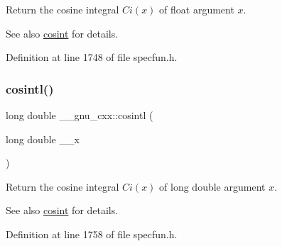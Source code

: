 Return the cosine integral $ Ci(x) $ of {\ttfamily float} argument $ x $.

\begin{DoxySeeAlso}{See also}
\hyperlink{group__gnu__math__spec__func_gafd398869cde057087e6b3428a1d13a93}{cosint} for details. 
\end{DoxySeeAlso}


Definition at line 1748 of file specfun.\+h.

\mbox{\label{group__gnu__math__spec__func_ga5f01f17ae8859129860118b09d51791c}} 
\subsubsection{\texorpdfstring{cosintl()}{cosintl()}}
{\footnotesize\ttfamily long double \+\_\+\+\_\+gnu\+\_\+cxx\+::cosintl (\begin{DoxyParamCaption}\item[{long double}]{\+\_\+\+\_\+x }\end{DoxyParamCaption})\hspace{0.3cm}{\ttfamily [inline]}}

Return the cosine integral $ Ci(x) $ of {\ttfamily long double} argument $ x $.

\begin{DoxySeeAlso}{See also}
\hyperlink{group__gnu__math__spec__func_gafd398869cde057087e6b3428a1d13a93}{cosint} for details. 
\end{DoxySeeAlso}


Definition at line 1758 of file specfun.\+h.

\mbox{\label{group__gnu__math__spec__func_ga5329bba77d10a9d2f15d9bbe43a70db3}} 
